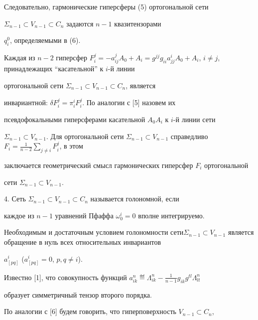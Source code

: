 Следовательно, гармонические гиперсферы (5) ортогональной сети 


$\Sigma_{n-1}\subset V_{n-1}\subset C_n$ задаются $n-1$ квазитензорами 


$q^0_i$, определяемыми в (6). 


 


Каждая из $n-2$ гиперсфер $F^j_i=-a^j_{ij}A_0+A_i=g^{jj}g_{ii} 


a^i_{jj}A_0+A_i$, $i\ne j$, принадлежащих ``касательной'' к $i$-й линии 


ортогональной сети $\Sigma_{n-1}\subset V_{n-1}\subset C_n$, является 


инвариантной: $\delta F^j_i=\pi^i_i F^j_i$. По аналогии с [5] назовем их 


псевдофокальными гиперсферами касательной $A_0A_i$ к $i$-й линии сети 


$\Sigma_{n-1}\subset V_{n-1}$. Для ортогональной сети $\Sigma_{n-1}\subset 


V_{n-1}$ справедливо $F_i=\frac{1}{n-2}\sum\limits_{j\ne i}F^j_i$, в этом 


заключается геометрический смысл гармонических гиперсфер $F_i$ ортогональной 


сети $\Sigma_{n-1}\subset V_{n-1}$. 


\medskip 


 


4. Сеть $\Sigma_{n-1}\subset V_{n-1}\subset C_n$ называется голономной, если 


каждое из $n-1$ уравнений Пфаффа $\omega^i_0=0$ вполне интегрируемо. 


Необходимым и достаточным условием голономности сети\linebreak $\Sigma_{n-1}\subset 


V_{n-1}$ является обращение в нуль всех относительных инвариантов 


$a{}^i_{[pq]}$ ($a{}^i_{[pq]}=0$, $p,q\ne i$). 


 


Известно [1], что совокупность функций $a^n_{ik}\eqdef\Lambda^n_{ik} 


-\frac{1}{n-1}g_{ik}g^{tl}\Lambda^n_{lt}$ 


образует симметричный тензор второго порядка. 


 


По аналогии с [6] будем говорить, что гиперповерхность $V_{n-1}\subset C_n$, 



